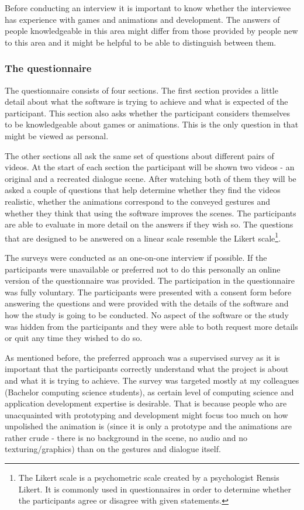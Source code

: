 Before conducting an interview it is important to know whether the interviewee has experience with games and animations and development. The answers of people knowledgeable in this area might differ from those provided by people new to this area and it might be helpful to be able to distinguish between them.

\medskip
\subsubsection{The questionnaire}
The questionnaire consists of four sections. The first section provides a little detail about what the software is trying to achieve and what is expected of the participant. This section also asks whether the participant considers themselves to be knowledgeable about games or animations. This is the only question in that might be viewed as personal.

The other sections all ask the same set of questions about different pairs of videos. At the start of each section the participant will be shown two videos - an original and a recreated dialogue scene. After watching both of them they will be asked a couple of questions that help determine whether they find the videos realistic, whether the animations correspond to the conveyed gestures and whether they think that using the software improves the scenes. The participants are able to evaluate in more detail on the answers if they wish so. The questions that are designed to be answered on a linear scale resemble the Likert scale\footnote{The Likert scale is a psychometric scale created by a psychologist Rensis Likert. It is commonly used in questionnaires in order to determine whether the participants agree or disagree with given statements.}.

The surveys were conducted as an one-on-one interview if possible. If the participants were unavailable or preferred not to do this personally an online version of the questionnaire was provided. The participation in the questionnaire was fully voluntary. The participants were presented with a consent form before answering the questions and were provided with the details of the software and how the study is going to be conducted. No aspect of the software or the study was hidden from the participants and they were able to both request more details or quit any time they wished to do so.

As mentioned before, the preferred approach was a supervised survey as it is important that the participants correctly understand what the project is about and what it is trying to achieve. The survey was targeted mostly at my colleagues (Bachelor computing science students), as certain level of computing science and application development expertise is desirable. That is because people who are unacquainted with prototyping and development might focus too much on how unpolished the animation is (since it is only a prototype and the animations are rather crude - there is no background in the scene, no audio and no texturing/graphics) than on the gestures and dialogue itself.

